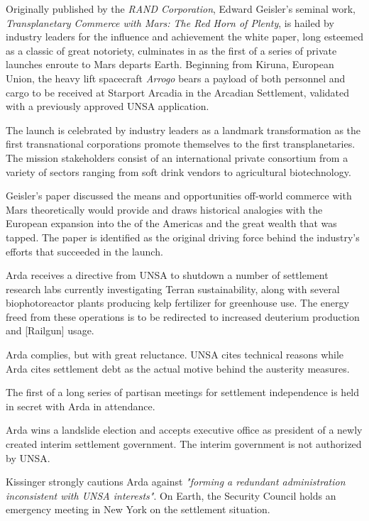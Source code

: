 Originally published by the {\it RAND Corporation}, Edward Geisler's seminal work, {\it Transplanetary Commerce with Mars: The Red Horn of Plenty}, is hailed by industry leaders for the influence and achievement the white paper, long esteemed as a classic of great notoriety, culminates in as the first of a series of private launches enroute to Mars departs Earth. Beginning from Kiruna, European Union, the heavy lift spacecraft {\it Arrogo} bears a payload of both personnel and cargo to be received at Starport Arcadia in the Arcadian Settlement, validated with a previously approved UNSA application.

The launch is celebrated by industry leaders as a landmark transformation as the first transnational corporations promote themselves to the first transplanetaries. The mission stakeholders consist of an international private consortium from a variety of sectors ranging from soft drink vendors to agricultural biotechnology.

Geisler's paper discussed the means and opportunities off-world commerce with Mars theoretically would provide and draws historical analogies with the European expansion into the  of the Americas and the great wealth that was tapped. The paper is identified as the original driving force behind the industry's efforts that succeeded in the launch.
\StopTimelineDate

Arda receives a directive from UNSA to shutdown a number of settlement research labs currently investigating Terran sustainability, along with several biophotoreactor plants producing kelp fertilizer for greenhouse use. The energy freed from these operations is to be redirected to increased deuterium production and [Railgun] usage. 

Arda complies, but with great reluctance. UNSA cites technical reasons while Arda cites settlement debt as the actual motive behind the austerity measures.
\StopTimelineDate

The first of a long series of partisan meetings for settlement independence is held in secret with Arda in attendance.
\StopTimelineDate

Arda wins a landslide election and accepts executive office as president of a newly created interim settlement government. The interim government is not authorized by UNSA. 

Kissinger strongly cautions Arda against {\it "forming a redundant administration inconsistent with UNSA interests"}. On Earth, the Security Council holds an emergency meeting in New York on the settlement situation.
\StopTimelineDate

